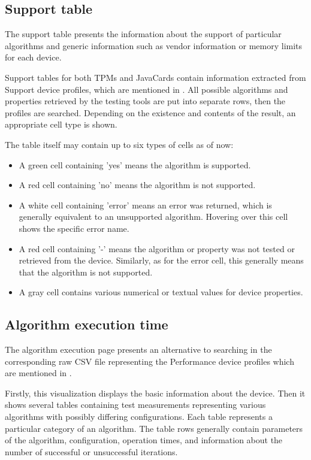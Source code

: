 \subsection{Support table}
The support table presents the information about the support of particular algorithms and generic information such as vendor information or memory limits for each device.

Support tables for both TPMs and JavaCards contain information extracted from Support device profiles, which are mentioned in . All possible algorithms and properties retrieved by the testing tools are put into separate rows, then the profiles are searched. Depending on the existence and contents of the result, an appropriate cell type is shown. 

The table itself may contain up to six types of cells as of now:
\begin{itemize}
    \item A green cell containing 'yes' means the algorithm is supported.
    \item A red cell containing 'no' means the algorithm is not supported.
    \item A white cell containing 'error' means an error was returned, which is generally equivalent to an unsupported algorithm. Hovering over this cell shows the specific error name.
    \item A red cell containing '-' means the algorithm or property was not tested or retrieved from the device. Similarly, as for the error cell, this generally means that the algorithm is not supported.
    \item A gray cell contains various numerical or textual values for device properties.
\end{itemize}



\subsection{Algorithm execution time}
The algorithm execution page presents an alternative to searching in the corresponding raw CSV file representing the Performance device profiles which are mentioned in  . 

Firstly, this visualization displays the basic information about the device. Then it shows several tables containing test measurements representing various algorithms with possibly differing configurations. Each table represents a particular category of an algorithm. The table rows generally contain parameters of the algorithm, configuration, operation times, and information about the number of successful or unsuccessful iterations.


